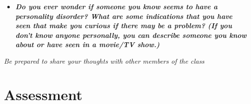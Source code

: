 \documentclass[
]{book}
\providecommand{\tightlist}{%
  \setlength{\itemsep}{0pt}\setlength{\parskip}{0pt}}
\begin{document}
\begin{reflect}
\begin{itemize}
\tightlist
\item
  \textbf{\emph{Do you ever wonder if someone you know seems to have a personality disorder? What are some indications that you have seen that make you curious if there may be a problem? (If you don't know anyone personally, you can describe someone you know about or have seen in a movie/TV show.)}}
\end{itemize}

\emph{Be prepared to share your thoughts with other members of the class}
\end{reflect}

\hypertarget{assessment-9}{%
\section*{Assessment}\label{assessment-9}}
\end{document}
